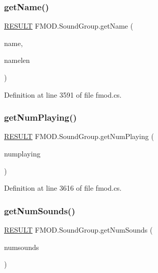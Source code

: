 \subsubsection{\texorpdfstring{get\+Name()}{getName()}}
{\footnotesize\ttfamily \hyperlink{namespace_f_m_o_d_a305d1176ef3f8c8815861a60407ac33d}{R\+E\+S\+U\+LT} F\+M\+O\+D.\+Sound\+Group.\+get\+Name (\begin{DoxyParamCaption}\item[{String\+Builder}]{name,  }\item[{int}]{namelen }\end{DoxyParamCaption})}



Definition at line 3591 of file fmod.\+cs.

\mbox{\label{class_f_m_o_d_1_1_sound_group_a0212da67240536acb48477d47935c5a3}} 
\subsubsection{\texorpdfstring{get\+Num\+Playing()}{getNumPlaying()}}
{\footnotesize\ttfamily \hyperlink{namespace_f_m_o_d_a305d1176ef3f8c8815861a60407ac33d}{R\+E\+S\+U\+LT} F\+M\+O\+D.\+Sound\+Group.\+get\+Num\+Playing (\begin{DoxyParamCaption}\item[{out int}]{numplaying }\end{DoxyParamCaption})}



Definition at line 3616 of file fmod.\+cs.

\mbox{\label{class_f_m_o_d_1_1_sound_group_a82d3cd3500a5befad41630a8383d5f69}} 
\subsubsection{\texorpdfstring{get\+Num\+Sounds()}{getNumSounds()}}
{\footnotesize\ttfamily \hyperlink{namespace_f_m_o_d_a305d1176ef3f8c8815861a60407ac33d}{R\+E\+S\+U\+LT} F\+M\+O\+D.\+Sound\+Group.\+get\+Num\+Sounds (\begin{DoxyParamCaption}\item[{out int}]{numsounds }\end{DoxyParamCaption})}




